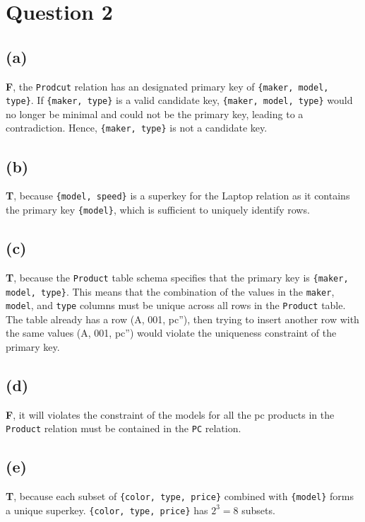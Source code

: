 \documentclass{article}
\begin{document}
\newpage
\section*{Question 2}
\subsection*{(a)}
\textbf{F}, the \texttt{Prodcut} relation has an designated primary key of \texttt{\{maker, model, type\}}. If \texttt{\{maker, type\}} is a valid candidate key, \texttt{\{maker, model, type\}} would no longer be minimal and could not be the primary key, leading to a contradiction. Hence, \texttt{\{maker, type\}} is not a candidate key.

\subsection*{(b)}
\textbf{T}, because \texttt{\{model, speed\}} is a superkey for the Laptop relation as it contains the primary key \texttt{\{model\}}, which is sufficient to uniquely identify rows.

\subsection*{(c)}
\textbf{T}, because the \texttt{Product} table schema specifies that the primary key is \texttt{\{maker, model, type\}}. This means that the combination of the values in the \texttt{maker}, \texttt{model}, and \texttt{type} columns must be unique across all rows in the \texttt{Product} table. The table already has a row (A, 001, pc''), then trying to insert another row with the same values (A, 001, pc'') would violate the uniqueness constraint of the primary key.

\subsection*{(d)}
\textbf{F}, it will violates the constraint of the models for all the pc products in the \texttt{Product} relation must be contained in the \texttt{PC} relation.

\subsection*{(e)}
\textbf{T}, because each subset of \texttt{\{color, type, price\}} combined with \texttt{\{model\}} forms a unique superkey. \texttt{\{color, type, price\}} has $2^3=8$ subsets.
\end{document}
